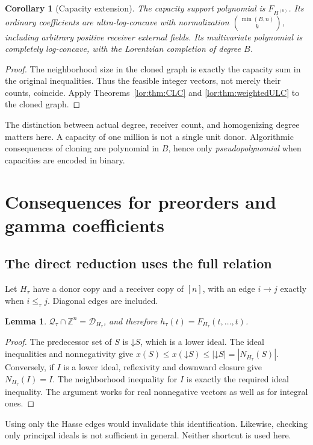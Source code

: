 \documentclass[11pt]{article}
\numberwithin{equation}{section}
\newtheorem{lemma}[theorem]{Lemma}
\newtheorem{corollary}[theorem]{Corollary}
\theoremstyle{definition}
\newcommand{\Z}{\mathbb Z}
\newcommand{\Qt}{\mathcal Q_\tau}
\newcommand{\down}{\mathord\downarrow}
\newcommand{\cD}{\mathcal D}
\begin{document}
\begin{corollary}[Capacity extension]\label{lor:cor:capacity}
The capacity support polynomial is $F_{H^{(b)}}$. Its ordinary coefficients
are ultra-log-concave with normalization
$\binom{\min(B,n)}k$, including arbitrary positive receiver external
fields. Its multivariate polynomial is completely log-concave, with the
Lorentzian completion of degree $B$.
\end{corollary}
\begin{proof}
The neighborhood size in the cloned graph is exactly the capacity sum in
the original inequalities. Thus the feasible integer vectors, not merely
their counts, coincide. Apply Theorems~\ref{lor:thm:CLC} and
\ref{lor:thm:weightedULC} to the cloned graph.
\end{proof}
The distinction between actual degree, receiver count, and homogenizing
degree matters here. A capacity of one million is not a single unit donor.
Algorithmic consequences of cloning are polynomial in $B$, hence only
\emph{pseudopolynomial} when capacities are encoded in binary.

\section{Consequences for preorders and gamma coefficients}
\label{lor:sec:preorders}
\subsection{The direct reduction uses the full relation}
Let $H_\tau$ have a donor copy and a receiver copy of $[n]$, with an edge
$i\to j$ exactly when $i\le_\tau j$. Diagonal edges are included.

\begin{lemma}\label{lor:lem:preorderreduction}
$\Qt\cap\Z^n=\cD_{H_\tau}$, and therefore
$h_\tau(t)=F_{H_\tau}(t,\ldots,t)$.
\end{lemma}
\begin{proof}
The predecessor set of $S$ is $\down S$, which is a lower ideal. The ideal
inequalities and nonnegativity give
$x(S)\le x(\down S)\le |\down S|=|N_{H_\tau}(S)|$.
Conversely, if $I$ is a lower ideal, reflexivity and downward closure give
$N_{H_\tau}(I)=I$. The neighborhood inequality for $I$ is exactly the
required ideal inequality. The argument works for real nonnegative vectors
as well as for integral ones.
\end{proof}
Using only the Hasse edges would invalidate this identification. Likewise,
checking only principal ideals is not sufficient in general. Neither
shortcut is used here.
\end{document}
